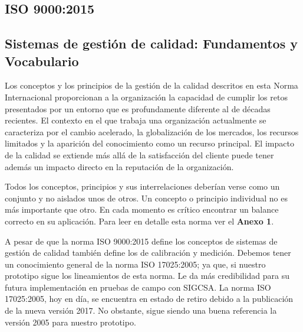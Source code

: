 \subsection{ISO 9000:2015 \cite{iso9000}}
\subsection*{Sistemas de gestión de calidad: Fundamentos y Vocabulario}

\par 
Los conceptos y los principios de la gestión de la calidad descritos en esta Norma Internacional proporcionan a la organización la capacidad de cumplir los retos presentados por un entorno que es profundamente diferente al de décadas recientes. El contexto en el que trabaja una organización actualmente se caracteriza por el cambio acelerado, la globalización de los mercados, los recursos limitados y la aparición del conocimiento como un recurso principal. El impacto de la calidad se extiende más allá de la satisfacción del cliente puede tener además un impacto directo en la reputación de la organización.

\par \noindent 
Todos los conceptos, principios y sus interrelaciones deberían verse como un conjunto y no aislados unos de otros. Un concepto o principio individual no es más importante que otro. En cada momento es crítico encontrar un balance correcto en su aplicación. Para leer en detalle esta norma ver el \textbf{Anexo 1}.

\par \noindent
A pesar de que la norma ISO 9000:2015 define los conceptos de sistemas de gestión de calidad también define los de calibración y medición. Debemos tener un conocimiento general de la norma ISO 17025:2005; ya que, si nuestro prototipo sigue los lineamientos de esta norma. Le da más credibilidad para su futura implementación en pruebas de campo con SIGCSA. La norma ISO 17025:2005, hoy en día, se encuentra en estado de retiro debido a la publicación de la nueva versión 2017. No obstante, sigue siendo una buena referencia la versión 2005 para nuestro prototipo.
